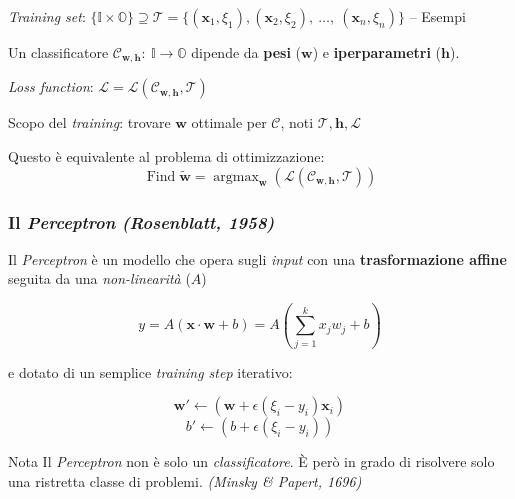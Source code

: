 \documentclass{beamer}
\DeclareMathOperator*{\argmax}{argmax}
\DeclareMathOperator*{\Find}{Find}
\begin{document}
{\begin{frame}
	\textit{Training set}: $\{\mathbb{I}\times\mathbb{O}\} \supseteq \mathcal{T} = \{(\boldsymbol{x}_1, \xi_1), (\boldsymbol{x}_2, \xi_2), \ \dots,\ (\boldsymbol{x}_n, \xi_n)\}$ -- Esempi

	\hfill\break

	Un classificatore $\mathcal{C}_{\boldsymbol{w}, \boldsymbol{h}}: \ \mathbb{I} \rightarrow \mathbb{O}$ dipende da \textbf{pesi} ($\boldsymbol{w}$) e \textbf{iperparametri} ($\boldsymbol{h}$).


	\textit{Loss function}: $\mathcal{L} = \mathcal{L}(\mathcal{C}_{\boldsymbol{w}, \boldsymbol{h}}, \mathcal{T})$

	\hfill\break

	Scopo del \textit{training}: trovare $\boldsymbol{w}$ ottimale per $\mathcal{C}$, noti $\mathcal{T}, \boldsymbol{h}, \mathcal{L}$


	\begin{block}{Questo è equivalente al problema di \alert{ottimizzazione}:}
		$$\Find \boldsymbol{\tilde{w}} = \argmax_{\boldsymbol{w}}\left(\mathcal{L}\left(\mathcal{C}_{\boldsymbol{w}, \boldsymbol{h}}, \mathcal{T}\right)\right)$$
	\end{block}
\end{frame}


\begin{frame}
	\frametitle{Il \textit{Perceptron} \textit{(Rosenblatt, 1958)}}

	Il \textit{Perceptron} è un modello che opera sugli \textit{input} con una \textbf{trasformazione affine} seguita da una \alert{\textit{non-linearità}} ($A$)

	$$
	y = A \left( \boldsymbol{x} \cdot \boldsymbol{w} + b \right) = A \left( \sum_{j=1}^{k}{x_j w_j + b} \right)
	$$

	e dotato di un semplice \textit{training step} iterativo:

	$$
	\boldsymbol{w'} \leftarrow \left( \boldsymbol{w} + \epsilon \left( \xi_i - y_i \right) \boldsymbol{x}_i  \right)
	$$
	$$
	b' \leftarrow \left( b + \epsilon \left( \xi_i - y_i \right) \right)
	$$

	\begin{alertblock}{Nota}
		Il \textit{Perceptron} non è solo un \textit{classificatore}. È però in grado di risolvere solo una ristretta classe di problemi. \textit{(Minsky \& Papert, 1696)}
	\end{alertblock}


\end{frame}}
\end{document}
